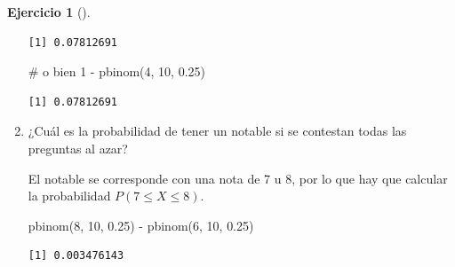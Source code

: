 \documentclass[
  a4paper,
]{scrreport}
\newenvironment{Shaded}{\begin{snugshade}}{\end{snugshade}}
\newcommand{\CommentTok}[1]{\textcolor[rgb]{0.37,0.37,0.37}{#1}}
\newcommand{\DecValTok}[1]{\textcolor[rgb]{0.68,0.00,0.00}{#1}}
\newcommand{\FloatTok}[1]{\textcolor[rgb]{0.68,0.00,0.00}{#1}}
\newcommand{\FunctionTok}[1]{\textcolor[rgb]{0.28,0.35,0.67}{#1}}
\newcommand{\NormalTok}[1]{\textcolor[rgb]{0.00,0.23,0.31}{#1}}
\newcommand{\SpecialCharTok}[1]{\textcolor[rgb]{0.37,0.37,0.37}{#1}}
\theoremstyle{definition}
\newtheorem{exercise}{Ejercicio}[chapter]
\theoremstyle{remark}
\begin{document}
\begin{exercise}[]
\begin{enumerate}
\begin{tcolorbox}
\begin{verbatim}
[1] 0.07812691
\end{verbatim}

\begin{Shaded}
\begin{Highlighting}[]
\CommentTok{\# o bien}
\DecValTok{1} \SpecialCharTok{{-}} \FunctionTok{pbinom}\NormalTok{(}\DecValTok{4}\NormalTok{, }\DecValTok{10}\NormalTok{, }\FloatTok{0.25}\NormalTok{)}
\end{Highlighting}
\end{Shaded}

\begin{verbatim}
[1] 0.07812691
\end{verbatim}

  \end{tcolorbox}
\item
  ¿Cuál es la probabilidad de tener un notable si se contestan todas las
  preguntas al azar?

  \begin{tcolorbox}[enhanced jigsaw, coltitle=black, left=2mm, colback=white, leftrule=.75mm, toptitle=1mm, breakable, bottomrule=.15mm, titlerule=0mm, bottomtitle=1mm, title=\textcolor{quarto-callout-tip-color}{\faLightbulb}\hspace{0.5em}{Solución}, arc=.35mm, toprule=.15mm, rightrule=.15mm, colframe=quarto-callout-tip-color-frame, opacityback=0, colbacktitle=quarto-callout-tip-color!10!white, opacitybacktitle=0.6]

  El notable se corresponde con una nota de 7 u 8, por lo que hay que
  calcular la probabilidad \(P(7\leq X\leq 8)\).

\begin{Shaded}
\begin{Highlighting}[]
\FunctionTok{pbinom}\NormalTok{(}\DecValTok{8}\NormalTok{, }\DecValTok{10}\NormalTok{, }\FloatTok{0.25}\NormalTok{) }\SpecialCharTok{{-}} \FunctionTok{pbinom}\NormalTok{(}\DecValTok{6}\NormalTok{, }\DecValTok{10}\NormalTok{, }\FloatTok{0.25}\NormalTok{)}
\end{Highlighting}
\end{Shaded}

\begin{verbatim}
[1] 0.003476143
\end{verbatim}

  \end{tcolorbox}
\end{enumerate}

\end{exercise}
\end{document}
